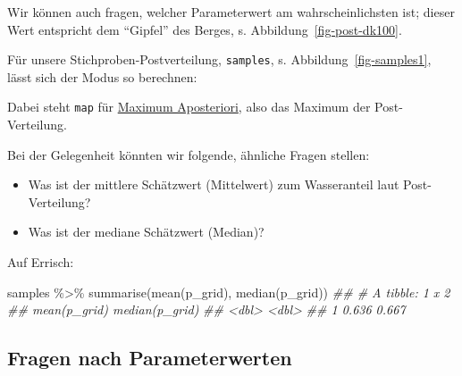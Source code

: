\documentclass[
  a4paper,
  DIV=11]{scrreprt}
\newenvironment{Shaded}{\begin{snugshade}}{\end{snugshade}}
\newcommand{\DocumentationTok}[1]{\textcolor[rgb]{0.37,0.37,0.37}{\textit{#1}}}
\newcommand{\FunctionTok}[1]{\textcolor[rgb]{0.28,0.35,0.67}{#1}}
\newcommand{\NormalTok}[1]{\textcolor[rgb]{0.00,0.23,0.31}{#1}}
\newcommand{\SpecialCharTok}[1]{\textcolor[rgb]{0.37,0.37,0.37}{#1}}
\providecommand{\tightlist}{%
  \setlength{\itemsep}{0pt}\setlength{\parskip}{0pt}}\usepackage{longtable,booktabs,array}
\theoremstyle{definition}
\theoremstyle{remark}
\begin{document}
Wir können auch fragen, welcher Parameterwert am wahrscheinlichsten ist;
dieser Wert entspricht dem ``Gipfel'' des Berges, s.
Abbildung~\ref{fig-post-dk100}.

Für unsere Stichproben-Postverteilung, \texttt{samples}, s.
Abbildung~\ref{fig-samples1}, lässt sich der Modus so berechnen:

\begin{Shaded}
\end{Shaded}

Dabei steht \texttt{map} für
\href{https://easystats.github.io/bayestestR/reference/map_estimate.html}{Maximum
Aposteriori}, also das Maximum der Post-Verteilung.

Bei der Gelegenheit könnten wir folgende, ähnliche Fragen stellen:

\begin{itemize}
\tightlist
\item
  Was ist der mittlere Schätzwert (Mittelwert) zum Wasseranteil laut
  Post-Verteilung?
\item
  Was ist der mediane Schätzwert (Median)?
\end{itemize}

Auf Errisch:

\begin{Shaded}
\begin{Highlighting}[]
\NormalTok{samples }\SpecialCharTok{\%\textgreater{}\%} 
  \FunctionTok{summarise}\NormalTok{(}\FunctionTok{mean}\NormalTok{(p\_grid),}
            \FunctionTok{median}\NormalTok{(p\_grid))}
\DocumentationTok{\#\# \# A tibble: 1 x 2}
\DocumentationTok{\#\#   \textasciigrave{}mean(p\_grid)\textasciigrave{} \textasciigrave{}median(p\_grid)\textasciigrave{}}
\DocumentationTok{\#\#            \textless{}dbl\textgreater{}            \textless{}dbl\textgreater{}}
\DocumentationTok{\#\# 1          0.636            0.667}
\end{Highlighting}
\end{Shaded}

\hypertarget{fragen-nach-parameterwerten}{%
\subsection{Fragen nach
Parameterwerten}\label{fragen-nach-parameterwerten}}
\end{document}
